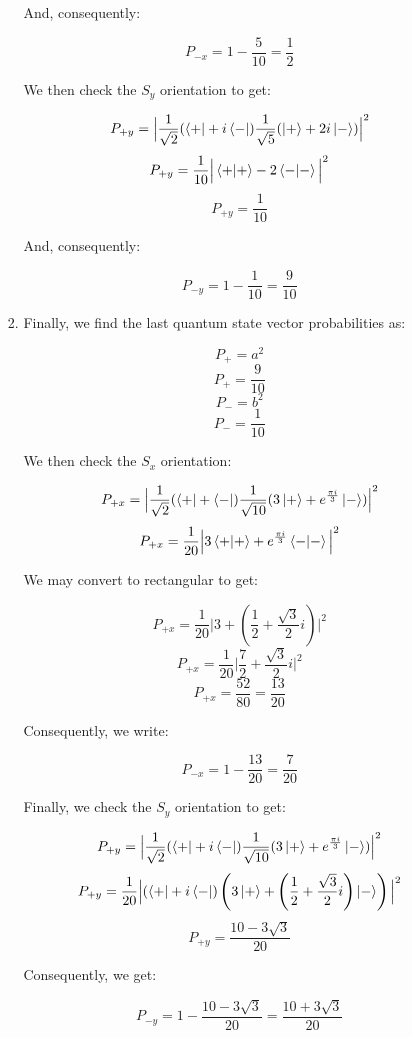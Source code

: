 \begin{enumerate}
\begin{enumerate}
\begin{enumerate}
            And, consequently:

            $$\boxed{P_{-x}=1-\frac{5}{10}=\frac{1}{2}}$$

            We then check the $S_y$ orientation to get:

            $$P_{+y}=\Big|\frac{1}{\sqrt{2}}(\bra{+}+i\bra{-})\frac{1}{\sqrt{5}}(\ket{+}+2i\ket{-})\Big|^2$$
            $$P_{+y}=\frac{1}{10}\Big|\braket{+}-2\braket{-}\Big|^2$$
            $$\boxed{P_{+y}=\frac{1}{10}}$$

            And, consequently:

            $$\boxed{P_{-y}=1-\frac{1}{10}=\frac{9}{10}}$$

          \item Finally, we find the last quantum state vector probabilities as:

            $$P_+=a^2$$
            $$\boxed{P_+=\frac{9}{10}}$$
            $$P_-=b^2$$
            $$\boxed{P_-=\frac{1}{10}}$$

            We then check the $S_x$ orientation:

            $$P_{+x}=\Big|\frac{1}{\sqrt{2}}(\bra{+}+\bra{-})\frac{1}{\sqrt{10}}(3\ket{+}+e^{\frac{\pi i}{3}}\ket{-})\Big|^2$$
            $$P_{+x}=\frac{1}{20}\Big|3\braket{+}+e^{\frac{\pi i}{3}}\braket{-}\Big|^2$$

            We may convert to rectangular to get:

            $$P_{+x}=\frac{1}{20}\Big|3+\left( \frac{1}{2}+\frac{\sqrt{3}}{2}i \right)\Big|^2$$
            $$P_{+x}=\frac{1}{20}\Big|\frac{7}{2}+\frac{\sqrt{3}}{2}i \Big|^2$$
            $$\boxed{P_{+x}=\frac{52}{80}=\frac{13}{20}}$$

            Consequently, we write:

            $$\boxed{P_{-x}=1-\frac{13}{20}=\frac{7}{20}}$$

            Finally, we check the $S_y$ orientation to get:

            $$P_{+y}=\Big|\frac{1}{\sqrt{2}}(\bra{+}+i\bra{-})\frac{1}{\sqrt{10}}(3\ket{+}+e^{\frac{\pi i}{3}}\ket{-})\Big|^2$$
            $$P_{+y}=\frac{1}{20}\Big|(\bra{+}+i\bra{-})\left( 3\ket{+}+\left( \frac{1}{2}+\frac{\sqrt{3}}{2}i \right)\ket{-} \right)\Big|^2$$
            $$\boxed{P_{+y}=\frac{10-3\sqrt{3}}{20}}$$

            Consequently, we get:

            $$\boxed{P_{-y}=1-\frac{10-3\sqrt{3}}{20}}=\frac{10+3\sqrt{3}}{20}$$

        \end{enumerate}


\end{enumerate}
\end{enumerate}
